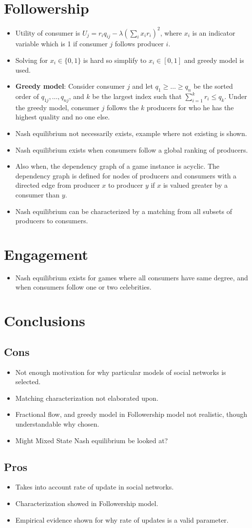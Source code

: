 \documentclass[8pt]{article}
\newcommand{\bi}{\begin{itemize}}
\newcommand{\ei}{\end{itemize}}
\begin{document}
\section{Followership}
\bi
\item Utility of consumer is $U_{j} = r_{i}q_{ij} - \lambda (\sum_{i}x_i
    r_{i})^2$, where $x_i$ is an indicator variable which is 1 if consumer $j$
    follows producer $i$.
\item Solving for $x_i \in \{0, 1\}$ is hard so simplify to $x_i \in [0,1]$ and greedy model is used.
\item \textbf{Greedy model}: Consider consumer $j$ and let $q_1 \geq \ldots \geq q_n$ be the sorted
    order of $q_{1j},\ldots,q_{nj}$, and $k$ be the largest index such that
    $\sum_{i=1}^{k}r_i \leq q_k$. Under the greedy model, consumer $j$
    follows the $k$ producers for who he has the highest quality and no one
    else.
\item Nash equilibrium not necessarily exists, example where not existing is
    shown.
\item Nash equilibrium exists when consumers follow a global ranking of
    producers.
\item Also when, the dependency graph of a game instance is acyclic. The
    dependency graph is defined for nodes of producers and consumers with a
    directed edge from producer $x$ to producer $y$ if $x$ is valued greater by
    a consumer than $y$.
\item Nash equilibrium can be characterized by a matching from all subsets of
    producers to consumers.
\ei

\section{Engagement}
\bi
\item Nash equilibrium exists for games where all consumers have same degree,
    and when consumers follow one or two celebrities.
\ei

\section{Conclusions}
\subsection{Cons}
\bi
\item Not enough motivation for why particular models of social networks is selected.
\item Matching characterization not elaborated upon.
\item Fractional flow, and greedy model in Followership model not realistic, though understandable why chosen.
\item Might Mixed State Nash equilibrium be looked at?
\ei

\subsection{Pros}
\bi
\item Takes into account rate of update in social networks.
\item Characterization showed in Followership model.
\item Empirical evidence shown for why rate of updates is a valid parameter.
\ei
\end{document}

